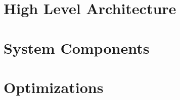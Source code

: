 \section{High Level Architecture}



\section{System Components}



\section{Optimizations}



\cleardoublepage